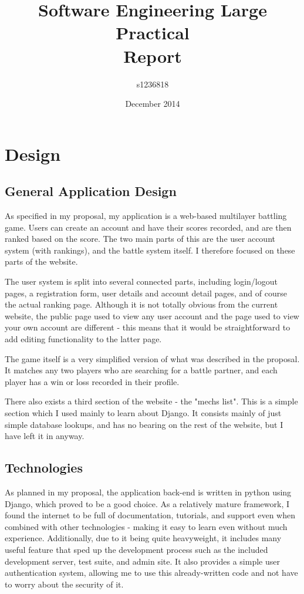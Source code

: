 \documentclass{article}
\begin{document}
\author{s1236818}
\title{Software Engineering Large Practical \\ Report}
\date{December 2014}
\maketitle

\section{Design}
\subsection{General Application Design}

As specified in my proposal, my application is a web-based multilayer battling game. Users can create an account and have their scores recorded, and are then ranked based on the score. The two main parts of this are the user account system (with rankings), and the battle system itself. I therefore focused on these parts of the website. 

The user system is split into several connected parts, including login/logout pages, a registration form, user details and account detail pages, and of course the actual ranking page. Although it is not totally obvious from the current website, the public page used to view any user account and the page used to view your own account are different - this means that it would be straightforward to add editing functionality to the latter page.

The game itself is a very simplified version of what was described in the proposal. It matches any two players who are searching for a battle partner, and each player has a win or loss recorded in their profile.

There also exists a third section of the website - the "mechs list". This is a simple section which I used mainly to learn about Django. It consists mainly of just simple database lookups, and has no bearing on the rest of the website, but I have left it in anyway.

\subsection{Technologies}

As planned in my proposal, the application back-end is written in python using Django, which proved to be a good choice. As a relatively mature framework, I found the internet to be full of documentation, tutorials, and support even when combined with other technologies - making it easy to learn even without much experience. Additionally, due to it being quite heavyweight, it includes many useful feature that sped up the development process such as the included development server, test suite, and admin site. It also provides a simple user authentication system, allowing me to use this already-written code and not have to worry about the security of it. 
\end{document}
